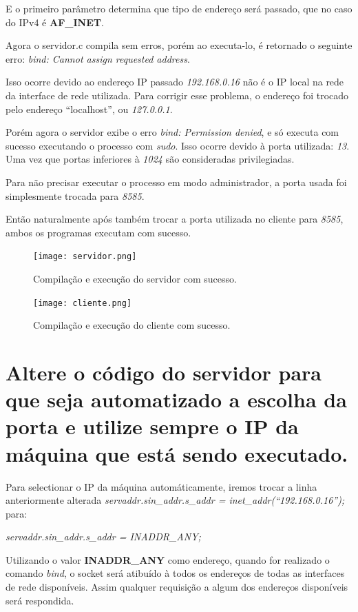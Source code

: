 \documentclass[12pt,a4paper]{report}
\begin{document}
E o primeiro parâmetro determina que tipo de endereço será passado, que no caso do IPv4 é \textbf{AF\_INET}.


\bigbreak

Agora o servidor.c compila sem erros, porém ao executa-lo, é retornado o seguinte erro: \emph{bind: Cannot assign requested address}.

Isso ocorre devido ao endereço IP passado \emph{192.168.0.16} não é o IP local na rede da interface de rede utilizada. Para corrigir esse problema, o endereço foi trocado pelo endereço ``localhost'', ou \emph{127.0.0.1}.

\bigbreak

Porém agora o servidor exibe o erro \emph{bind: Permission denied}, e só executa com sucesso executando o processo com \emph{sudo}. Isso ocorre devido à porta utilizada: \emph{13}. Uma vez que portas inferiores à \emph{1024} são consideradas privilegiadas.

Para não precisar executar o processo em modo administrador, a porta usada foi simplesmente trocada para \emph{8585}.

\bigbreak

Então naturalmente após também trocar a porta utilizada no cliente para \emph{8585}, ambos os programas executam com sucesso.

\begin{figure}[H]
  \texttt{[image: servidor.png]}
  \caption{Compilação e execução do servidor com sucesso.}
\end{figure}

\begin{figure}[H]
  \texttt{[image: cliente.png]}
  \caption{Compilação e execução do cliente com sucesso.}
\end{figure}

\section{Altere o código do servidor para que seja automatizado a escolha da porta e utilize sempre o
IP da máquina que está sendo executado.}

Para selectionar o IP da máquina automáticamente, iremos trocar a linha anteriormente alterada \emph{servaddr.sin\_addr.s\_addr = inet\_addr(``192.168.0.16'');} para: 

\emph{servaddr.sin\_addr.s\_addr = INADDR\_ANY;}

\bigbreak

Utilizando o valor \textbf{INADDR\_ANY} como endereço, quando for realizado o comando \emph{bind}, 
o socket será atibuído à todos os endereços de todas as interfaces de rede disponíveis. 
Assim qualquer requisição a algum dos endereços disponíveis será respondida.
\end{document}
